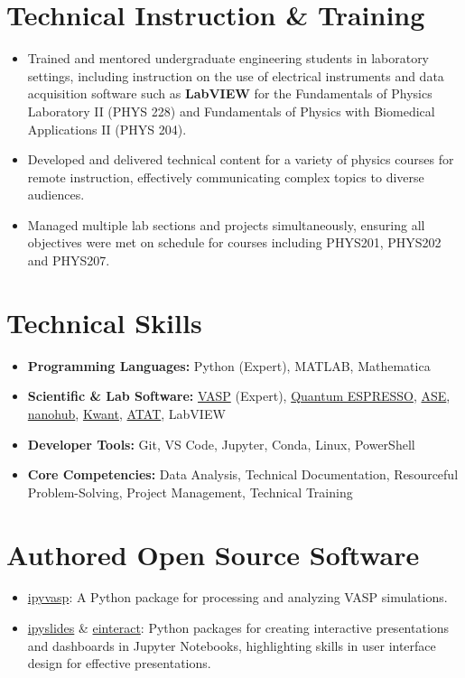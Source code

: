 \documentclass[letter,11pt]{article}
\begin{document}
\section{Technical Instruction \& Training}
\begin{itemize}
    \item Trained and mentored undergraduate engineering students in laboratory settings, including instruction on the use of electrical instruments and data acquisition software such as \textbf{LabVIEW} for the Fundamentals of Physics Laboratory II (PHYS 228) and Fundamentals of Physics with Biomedical Applications II (PHYS 204).
    \item Developed and delivered technical content for a variety of physics courses for remote instruction, effectively communicating complex topics to diverse audiences.
    \item Managed multiple lab sections and projects simultaneously, ensuring all objectives were met on schedule for courses including PHYS201, PHYS202 and PHYS207.
\end{itemize}


\section{Technical Skills}
\begin{itemize}
    \item \textbf{Programming Languages:} Python (Expert), MATLAB, Mathematica
    \item \textbf{Scientific \& Lab Software:} \href{https://www.vasp.at/}{VASP} (Expert), \href{https://www.quantum-espresso.org/}{Quantum ESPRESSO}, \href{https://wiki.fysik.dtu.dk/ase/}{ASE}, \href{https://nanohub.org}{nanohub}, \href{https://kwant-project.org}{Kwant}, \href{https://axelvandewalle.github.io/www-avdw/atat/}{ATAT}, LabVIEW
    \item \textbf{Developer Tools:} Git, VS Code, Jupyter, Conda, Linux, PowerShell
    \item \textbf{Core Competencies:} Data Analysis, Technical Documentation, Resourceful Problem-Solving, Project Management, Technical Training
\end{itemize}

\section{Authored Open Source Software}
\begin{itemize}
    \item \href{https://github.com/asaboor-gh/ipyvasp}{ipyvasp}: A Python package for processing and analyzing VASP simulations.
    \item \href{https://github.com/asaboor-gh/ipyslides}{ipyslides} \& \href{https://github.com/asaboor-gh/einteract}{einteract}: Python packages for creating interactive presentations and dashboards in Jupyter Notebooks, highlighting skills in user interface design for effective presentations.
\end{itemize}
\end{document}
